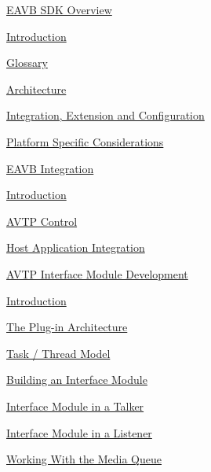 
\begin{DoxyItemize}
\item \hyperlink{sdk_overview}{E\+A\+VB S\+DK Overview}
\begin{DoxyItemize}
\item \hyperlink{sdk_overview_sdk_overview_introduction}{Introduction}
\item \hyperlink{sdk_overview_sdk_overview_glossary}{Glossary}
\item \hyperlink{sdk_overview_sdk_overview_architecture}{Architecture}
\item \hyperlink{sdk_overview_sdk_overview_integration}{Integration, Extension and Configuration}
\item \hyperlink{sdk_overview_sdk_overview_platform}{Platform Specific Considerations}
\end{DoxyItemize}
\item \hyperlink{sdk_integration}{E\+A\+VB Integration}
\begin{DoxyItemize}
\item \hyperlink{sdk_integration_sdk_integration_introduction}{Introduction}
\item \hyperlink{sdk_integration_sdk_integration_avtp_control}{A\+V\+TP Control}
\item \hyperlink{sdk_integration_sdk_integration_host_app}{Host Application Integration}
\end{DoxyItemize}
\item \hyperlink{sdk_avtp_interface_module_dev}{A\+V\+TP Interface Module Development}
\begin{DoxyItemize}
\item \hyperlink{sdk_avtp_interface_module_dev_sdk_avtp_intf_module_introduction}{Introduction}
\item \hyperlink{sdk_avtp_interface_module_dev_sdk_avtp_intf_module_plugin}{The Plug-\/in Architecture}
\item \hyperlink{sdk_avtp_interface_module_dev_sdk_avtp_intf_module_task}{Task / Thread Model}
\item \hyperlink{sdk_avtp_interface_module_dev_sdk_avtp_intf_module_building}{Building an Interface Module}
\item \hyperlink{sdk_avtp_interface_module_dev_sdk_avtp_intf_module_talker}{Interface Module in a Talker}
\item \hyperlink{sdk_avtp_interface_module_dev_sdk_avtp_intf_module_listener}{Interface Module in a Listener}
\item \hyperlink{sdk_avtp_interface_module_dev_working_with_mediaq}{Working With the Media Queue}

\end{DoxyItemize}
\end{DoxyItemize}
